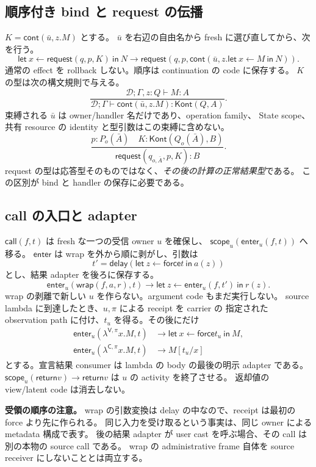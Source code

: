 \documentclass[11pt,a4paper]{article}
\newcommand{\Ret}{\mathsf{return}}
\newcommand{\Req}{\mathsf{request}}
\newcommand{\Force}{\mathsf{force}}
\newcommand{\Call}{\mathsf{call}}
\newcommand{\Delay}{\mathsf{delay}}
\newcommand{\Scope}{\mathsf{scope}}
\newcommand{\D}{\mathcal D}
\newcommand{\ty}{\mathrel{\vdash}}
\begin{document}
\subsection{順序付き bind と request の伝播}

\(K=\mathsf{cont}(\bar u,z.M)\) とする。
\(\bar u\) を右辺の自由名から fresh に選び直してから、次を行う。
\[
 \mathsf{let}\ x\leftarrow\Req(q,p,K)\ \mathsf{in}\ N
 \longrightarrow
 \Req(q,p,\mathsf{cont}(\bar u,z.
       \mathsf{let}\ x\leftarrow M\ \mathsf{in}\ N)).
\]
通常の effect を rollback しない。順序は continuation の code に保存する。
\(K\) の型は次の構文規則で与える。
\[
 \frac{\D;\Gamma,z:Q\ty M:A}
 {\D;\Gamma\ty\mathsf{cont}(\bar u,z.M):\mathsf{Kont}(Q,A)}.
\]
束縛される \(\bar u\) は owner/handler 名だけであり、operation family、
State scope、共有 resource の identity と型引数はこの束縛に含めない。
\[
 \frac{p:P_o(\bar A)\quad K:\mathsf{Kont}(Q_o(\bar A),B)}
 {\Req(q_{o,\bar A},p,K):B}.
\]
request の型は応答型そのものではなく、\emph{その後の計算の正常結果型}である。
この区別が bind と handler の保存に必要である。

\subsection{call の入口と adapter}

\(\Call(f,t)\) は fresh な一つの受信 owner \(u\) を確保し、
\(\Scope_u(\mathsf{enter}_u(f,t))\) へ移る。
\(\mathsf{enter}\) は wrap を外から順に剥がし、引数は
\[
 t'=\Delay(\mathsf{let}\ z\leftarrow\Force t\ \mathsf{in}\ a(z))
\]
とし、結果 adapter を後ろに保存する。
\[
 \mathsf{enter}_u(\mathsf{wrap}(f,a,r),t)
 \longrightarrow
 \mathsf{let}\ z\leftarrow\mathsf{enter}_u(f,t')\ \mathsf{in}\ r(z).
\]
wrap の剥離で新しい \(u\) を作らない。argument code もまだ実行しない。
source lambda に到達したとき、\(u,\pi\) による receipt を carrier の
指定された observation path に付け、\(t_u\) を得る。その後にだけ
\[
\begin{split}
 \mathsf{enter}_u(\lambda^{\mathsf V,\pi}x.M,t)
 &\longrightarrow\mathsf{let}\ x\leftarrow\Force t_u\ \mathsf{in}\ M,\\
 \mathsf{enter}_u(\lambda^{\mathsf C,\pi}x.M,t)
 &\longrightarrow M[t_u/x]
\end{split}
\]
とする。宣言結果 consumer は lambda の body の最後の明示 adapter である。
\(\Scope_u(\Ret v)\to\Ret v\) は \(u\) の activity を終了させる。
返却値の view/latent code は消去しない。

\textbf{受領の順序の注意。}
wrap の引数変換は delay の中なので、receipt は最初の force より先に作られる。
同じ入力を受け取るという事実は、同じ owner による metadata 構成で表す。
後の結果 adapter が user cast を呼ぶ場合、その call は別の本物の source call である。
wrap の administrative frame 自体を source receiver にしないこととは両立する。
\end{document}
